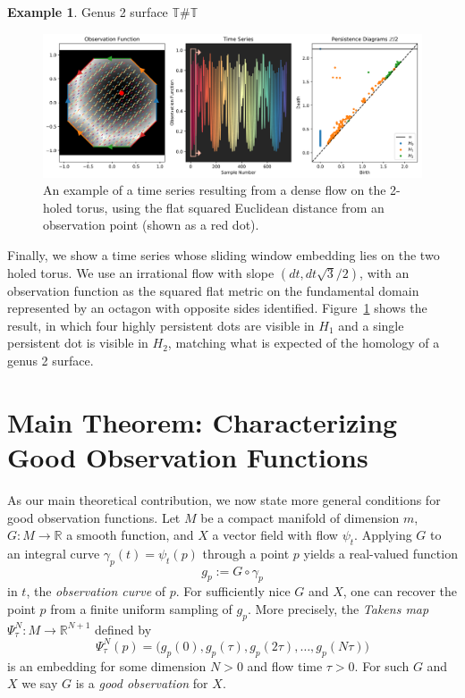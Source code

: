 \documentclass[11pt]{article}
\theoremstyle{definition}
\newtheorem{example}[theorem]{Example}
\theoremstyle{remark}
\newcommand{\RR}{\mathbb{R}}
\newcommand{\TT}{\mathbb{T}}
\begin{document}
    \begin{example}
    Genus 2 surface $\TT \# \TT$


    \begin{figure}[!htb]
        \centering
        \includegraphics[width=\textwidth]{2HoledTorus_SquaredDist.png}
        \caption{An example of a time series resulting from a dense flow on the 2-holed torus, using the flat squared Euclidean distance \cite{zorich2006flat} from an observation point (shown as a red dot).}
        \label{fig:TwoHoledTorusDist}
    \end{figure}

    Finally, we show a time series whose sliding window embedding lies on the two holed torus.  We use an irrational flow with slope $(dt, dt \sqrt{3}/2)$, with an observation function as the squared flat metric on the fundamental domain \cite{zorich2006flat} represented by an octagon with opposite sides identified.  Figure~\ref{fig:TwoHoledTorusDist} shows the result, in which four highly persistent dots are visible in $H_1$ and a single persistent dot is visible in $H_2$, matching what is expected of the homology of a genus 2 surface.

    \end{example}



    \section{Main Theorem: Characterizing Good Observation Functions}
    \label{sec:goodobservations}

    As our main theoretical contribution, we now state more general conditions for good observation functions.  Let $M$ be a compact manifold of dimension $m$, $G:M \rightarrow \RR$ a smooth function, and $X$ a vector field with flow $\psi_t$. Applying $G$ to an integral curve $\gamma_p(t) = \psi_t(p)$ through a point $p$
    yields a real-valued function
    \[g_p := G\circ\gamma_p\]
    in $t$, the \textit{observation curve} of $p$. For sufficiently nice $G$ and $X$, one can recover the point $p$ from a finite uniform sampling of $g_p$. More precisely, the \textit{Takens map} $\Psi_\tau^N: M \rightarrow \RR^{N+1}$ defined by
    \[\Psi_\tau^N(p) = \big(g_p(0), g_p(\tau), g_p(2\tau), \ldots, g_p(N\tau)\big)\]
    is an embedding for some dimension $N>0$ and flow time $\tau>0$. For such $G$ and $X$ we say $G$ is a \textit{good observation} for $X$.
    
\end{document}
